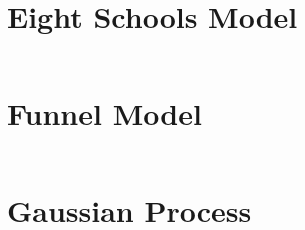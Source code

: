 \documentclass{article}
\begin{document}
\section{Eight Schools Model}

\inputminted[bgcolor=bg]{stan}{example-models/misc/eight_schools/eight_schools.stan}

\section{Funnel Model}

\inputminted[bgcolor=bg]{stan}{example-models/misc/funnel/funnel.stan}

\section{Gaussian Process}

\inputminted[bgcolor=bg]{stan}{example-models/misc/gaussian-process/gp-fit.stan}
\end{document}
